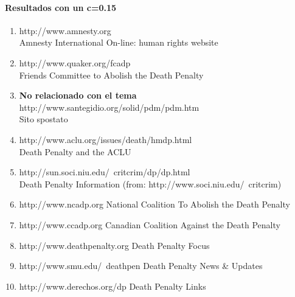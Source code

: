 \paragraph{Resultados con un c=0.15}
\begin{enumerate}
\item
http://www.amnesty.org\\
Amnesty International On-line: human rights website\\
\item
http://www.quaker.org/fcadp\\
Friends Committee to Abolish the Death Penalty\\
\item
\textbf{No relacionado con el tema}\\
http://www.santegidio.org/solid/pdm/pdm.htm\\
Sito spostato\\
\item
http://www.aclu.org/issues/death/hmdp.html\\
Death Penalty and the ACLU\\
\item
http://sun.soci.niu.edu/~critcrim/dp/dp.html\\
Death Penalty Information (from: http://www.soci.niu.edu/~critcrim)\\
\item
http://www.ncadp.org
National Coalition To Abolish the Death Penalty
\item
http://www.ccadp.org
Canadian Coalition Against the Death Penalty
\item
http://www.deathpenalty.org
Death Penalty Focus
\item
http://www.smu.edu/~deathpen
Death Penalty News \& Updates
\item
http://www.derechos.org/dp
Death Penalty Links

\end{enumerate}
